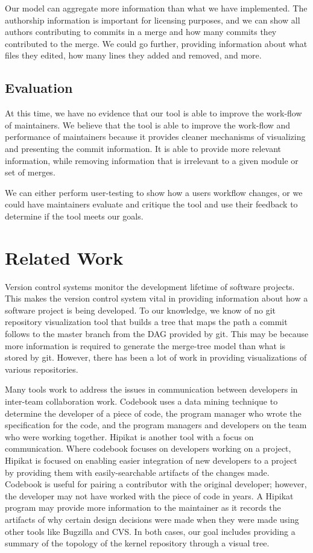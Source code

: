 \documentclass[conference, draftclsnofoot, draft]{IEEEtran}
\begin{document}
Our model can aggregate more information than what we have implemented. The
authorship information is important for licensing purposes, and we can show all
authors contributing to commits in a  merge and how many commits they contributed to
the merge. We could go further, providing information about what files they edited,
how many lines they added and removed, and more.

\subsection{Evaluation}

At this time, we have no evidence that our tool is able to improve the work-flow of
maintainers. We believe that the tool is able to improve the work-flow and
performance of maintainers because it provides cleaner mechanisms of visualizing and
presenting the commit information. It is able to provide more relevant information,
while removing information that is irrelevant to a given module or set of merges.

We can either perform user-testing to show how a users workflow changes, or we could
have maintainers evaluate and critique the tool and use their feedback to determine
if the tool meets our goals.

\section{Related Work}

Version control systems monitor the development lifetime of software projects. This
makes the version control system vital in providing information about how a software
project is being developed. To our knowledge, we know of no git repository
visualization tool that builds a tree that maps the path a commit follows to the
master branch from the DAG provided by git. This may be because more information is
required to generate the merge-tree model than what is stored by git. However, there
has been a lot of work in providing visualizations of various repositories.

Many tools work to address the issues in communication between developers in
inter-team collaboration work. Codebook \cite{Begel2010} uses a data mining
technique  to determine the developer of a piece of code, the program manager who
wrote the specification for the code, and the program managers and developers on the
team who were working together. Hipikat\cite{Cubranic2005} is another tool with a
focus on communication. Where codebook focuses on developers working on a project,
Hipikat is focused on enabling easier integration of new developers to a project by
providing them with easily-searchable artifacts of the changes made. Codebook is
useful for pairing a contributor with the original developer; however, the developer
may not have worked with the piece of code in years. A Hipikat program may provide
more information to the maintainer as it records the artifacts of why certain
design decisions were made when they were made using other tools like Bugzilla and
CVS. In both cases, our goal includes providing a summary of the topology of the
kernel repository through a visual tree.
\end{document}
